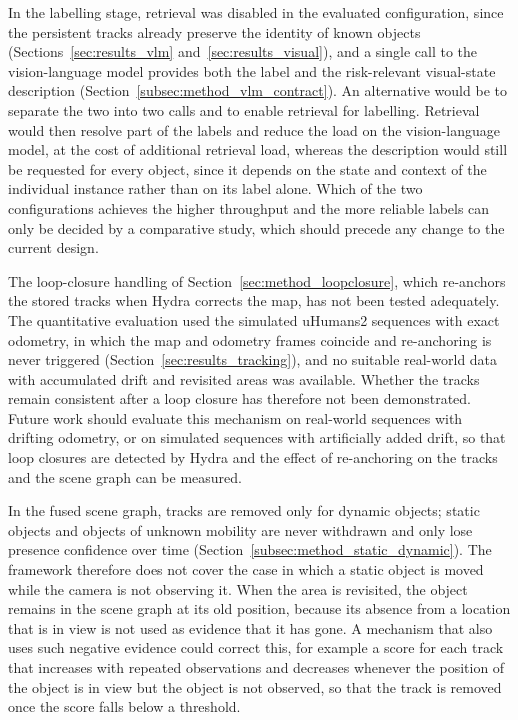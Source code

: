 {\small In the labelling stage, retrieval was disabled in the evaluated configuration, since the persistent tracks already preserve the identity of known objects (Sections~\ref{sec:results_vlm} and~\ref{sec:results_visual}), and a single call to the vision-language model provides both the label and the risk-relevant visual-state description (Section~\ref{subsec:method_vlm_contract}). An alternative would be to separate the two into two calls and to enable retrieval for labelling. Retrieval would then resolve part of the labels and reduce the load on the vision-language model, at the cost of additional retrieval load, whereas the description would still be requested for every object, since it depends on the state and context of the individual instance rather than on its label alone. Which of the two configurations achieves the higher throughput and the more reliable labels can only be decided by a comparative study, which should precede any change to the current design.\par}

{\small The loop-closure handling of Section~\ref{sec:method_loopclosure}, which re-anchors the stored tracks when Hydra corrects the map, has not been tested adequately. The quantitative evaluation used the simulated uHumans2 sequences with exact odometry, in which the map and odometry frames coincide and re-anchoring is never triggered (Section~\ref{sec:results_tracking}), and no suitable real-world data with accumulated drift and revisited areas was available. Whether the tracks remain consistent after a loop closure has therefore not been demonstrated. Future work should evaluate this mechanism on real-world sequences with drifting odometry, or on simulated sequences with artificially added drift, so that loop closures are detected by Hydra and the effect of re-anchoring on the tracks and the scene graph can be measured.\par}

{\small In the fused scene graph, tracks are removed only for dynamic objects; static objects and objects of unknown mobility are never withdrawn and only lose presence confidence over time (Section~\ref{subsec:method_static_dynamic}). The framework therefore does not cover the case in which a static object is moved while the camera is not observing it. When the area is revisited, the object remains in the scene graph at its old position, because its absence from a location that is in view is not used as evidence that it has gone. A mechanism that also uses such negative evidence could correct this, for example a score for each track that increases with repeated observations and decreases whenever the position of the object is in view but the object is not observed, so that the track is removed once the score falls below a threshold.\par}

